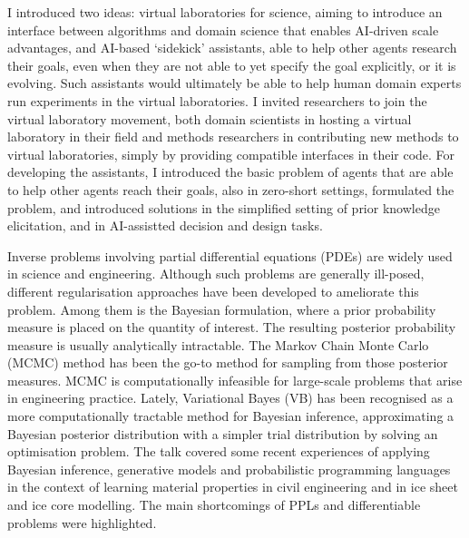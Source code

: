\documentclass[a4paper,UKenglish]{dagrep-v2018}
\begin{document}
I introduced two ideas: virtual laboratories for science, aiming to introduce an interface between algorithms and domain science that enables AI-driven scale advantages, and AI-based ‘sidekick’ assistants, able to help other agents research their goals, even when they are not able to yet specify the goal explicitly, or it is evolving. Such assistants would ultimately be able to help human domain experts run experiments in the virtual laboratories. I invited researchers to join the virtual laboratory movement, both domain scientists in hosting a virtual laboratory in their field and methods researchers in contributing new methods to virtual laboratories, simply by providing compatible interfaces in their code. For developing the assistants, I introduced the basic problem of agents that are able to help other agents reach their goals, also in zero-short settings, formulated the problem, and introduced solutions in the simplified setting of prior knowledge elicitation, and in AI-assistted decision and design tasks.

\license

Inverse problems involving partial differential equations (PDEs) are widely used in science and engineering. Although such problems are generally ill-posed, different regularisation approaches have been developed to ameliorate this problem. Among them is the Bayesian formulation, where a prior probability measure is placed on the quantity of interest. The resulting posterior probability measure is usually analytically intractable. The Markov Chain Monte Carlo (MCMC) method has been the go-to method for sampling from those posterior measures. MCMC is computationally infeasible for large-scale problems that arise in engineering practice. Lately, Variational Bayes (VB) has been recognised as a more computationally tractable method for Bayesian inference, approximating a Bayesian posterior distribution with a simpler trial distribution by solving an optimisation problem. The talk covered some recent experiences of applying Bayesian inference, generative models and probabilistic programming languages in the context of learning material properties in civil engineering and in ice sheet and ice core modelling. The main shortcomings of PPLs and differentiable problems were highlighted.

\license
\end{document}
